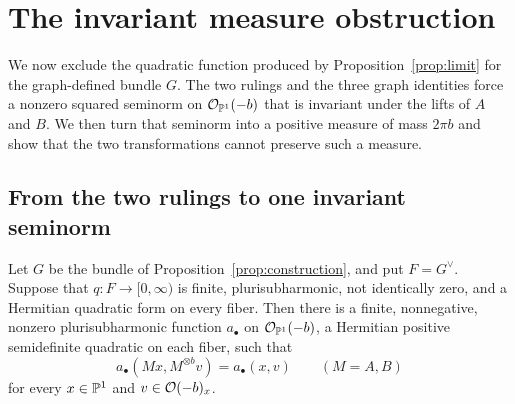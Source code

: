 \section{The invariant measure obstruction}
\label{sec:obstruction}

We now exclude the quadratic function produced by
Proposition~\ref{prop:limit} for the graph-defined bundle $G$.
The two rulings and the three graph identities force a nonzero squared seminorm on $\mathcal O_{\mathbb P^1}(-b)$
that is invariant under the lifts of $A$ and $B$.
We then turn that seminorm into a positive measure of mass $2\pi b$
and show that the two transformations cannot preserve such a measure.

\subsection{From the two rulings to one invariant seminorm}

\begin{lemma}\label{lem:ruling-reduction}
Let $G$ be the bundle of Proposition~\ref{prop:construction}, and put
$F=G^\vee$. Suppose that $q:F\to[0,\infty)$ is finite,
plurisubharmonic, not identically zero, and a Hermitian quadratic form
on every fiber. Then there is a finite, nonnegative, nonzero
plurisubharmonic function $a_\bullet$ on $\mathcal O_{\mathbb P^1}(-b)$, a Hermitian
positive semidefinite quadratic on each fiber, such that
\[
 a_\bullet(Mx,M^{\otimes b}v)=a_\bullet(x,v)
 \qquad(M=A,B)
\]
for every $x\in\mathbb P^1$ and $v\in\mathcal O(-b)_x$.
\end{lemma}

